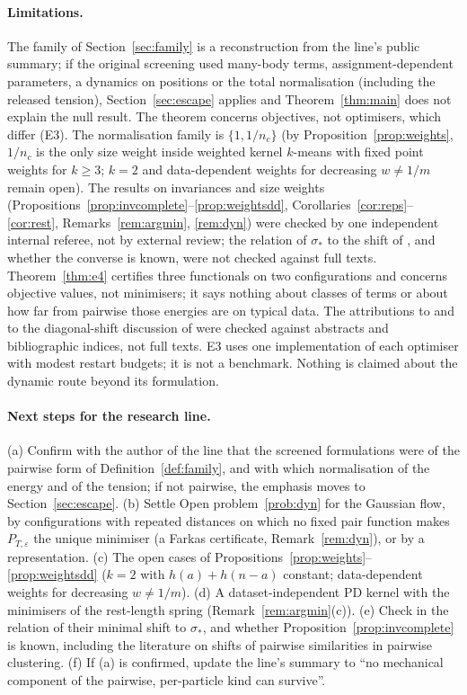 \documentclass[11pt,a4paper]{article}
\theoremstyle{plain}
\theoremstyle{definition}
\theoremstyle{remark}
\begin{document}
\paragraph{Limitations.} The family of Section~\ref{sec:family} is a reconstruction from the line's public summary; if the original screening used many-body terms, assignment-dependent parameters, a dynamics on positions or the total normalisation (including the released tension), Section~\ref{sec:escape} applies and Theorem~\ref{thm:main} does not explain the null result. The theorem concerns objectives, not optimisers, which differ (E3). The normalisation family is $\{1,1/n_c\}$ (by Proposition~\ref{prop:weights}, $1/n_c$ is the only size weight inside weighted kernel $k$-means with fixed point weights for $k\ge3$; $k=2$ and data-dependent weights for decreasing $w\ne1/m$ remain open). The results on invariances and size weights (Propositions~\ref{prop:invcomplete}--\ref{prop:weightsdd}, Corollaries~\ref{cor:reps}--\ref{cor:rest}, Remarks~\ref{rem:argmin}, \ref{rem:dyn}) were checked by one independent internal referee, not by external review; the relation of $\sigma_*$ to the shift of \citet{roth2003}, and whether the converse is known, were not checked against full texts. Theorem~\ref{thm:e4} certifies three functionals on two configurations and concerns objective values, not minimisers; it says nothing about classes of terms or about how far from pairwise those energies are on typical data. The attributions to \citet{franca2021} and to the diagonal-shift discussion of \citet{dhillon2005tr,dhillon2007} were checked against abstracts and bibliographic indices, not full texts. E3 uses one implementation of each optimiser with modest restart budgets; it is not a benchmark. Nothing is claimed about the dynamic route beyond its formulation.

\paragraph{Next steps for the research line.} (a) Confirm with the author of the line that the screened formulations were of the pairwise form of Definition~\ref{def:family}, and with which normalisation of the energy and of the tension; if not pairwise, the emphasis moves to Section~\ref{sec:escape}. (b) Settle Open problem~\ref{prob:dyn} for the Gaussian flow, by configurations with repeated distances on which no fixed pair function makes $P_{T,\varepsilon}$ the unique minimiser (a Farkas certificate, Remark~\ref{rem:dyn}), or by a representation. (c) The open cases of Propositions~\ref{prop:weights}--\ref{prop:weightsdd} ($k=2$ with $h(a)+h(n-a)$ constant; data-dependent weights for decreasing $w\ne1/m$). (d) A dataset-independent PD kernel with the minimisers of the rest-length spring (Remark~\ref{rem:argmin}(c)). (e) Check in \citet{roth2003} the relation of their minimal shift to $\sigma_*$, and whether Proposition~\ref{prop:invcomplete} is known, including the literature on shifts of pairwise similarities in pairwise clustering. (f) If (a) is confirmed, update the line's summary to ``no mechanical component of the pairwise, per-particle kind can survive''.
\end{document}
